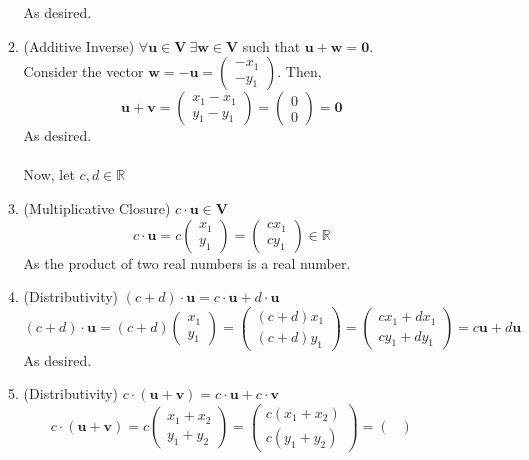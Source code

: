 \documentclass[letterpaper,10pt]{article}
\newcommand{\R}{\mathbb{R}}
\newcommand{\vect}[1]{\boldsymbol{#1}}
\begin{document}
\begin{description}
\begin{enumerate}
\begin{enumerate}
As desired.
\item (Additive Inverse) $\forall\vect{u}\in\vect{V}\ \exists\vect{w}\in\vect{V}$ such that $\vect{u}+\vect{w}=\vect{0}$.\\
Consider the vector $\vect{w}=-\vect{u}=\begin{pmatrix}
-x_1 \\
-y_1
\end{pmatrix}$. Then,
\[\vect{u}+\vect{v}=\begin{pmatrix}
x_1-x_1 \\
y_1-y_1
\end{pmatrix}=\begin{pmatrix}
0 \\
0
\end{pmatrix}=\vect{0}\]
As desired.\\\\
Now, let $c,d\in\R$
\item (Multiplicative Closure) $c\cdot\vect{u}\in\vect{V}$
\[c\cdot\vect{u}=c\begin{pmatrix}
x_1 \\
y_1
\end{pmatrix}=\begin{pmatrix}
cx_1 \\
cy_1
\end{pmatrix}\in\R\]
As the product of two real numbers is a real number.
\item  (Distributivity) $(c+d)\cdot\vect{u}=c\cdot\vect{u}+d\cdot\vect{u}$
\[(c+d)\cdot\vect{u}=(c+d)\begin{pmatrix}
x_1 \\
y_1
\end{pmatrix}=\begin{pmatrix}
(c+d)x_1 \\
(c+d)y_1
\end{pmatrix}=\begin{pmatrix}
cx_1+dx_1 \\
cy_1+dy_1
\end{pmatrix}=c\vect{u}+d\vect{u}\]
As desired.
\item (Distributivity) $c\cdot(\vect{u}+\vect{v})=c\cdot\vect{u}+c\cdot\vect{v}$
\[c\cdot(\vect{u}+\vect{v})=c\begin{pmatrix}
x_1+x_2\\
y_1+y_2
\end{pmatrix}=\begin{pmatrix}
c(x_1+x_2) \\
c(y_1+y_2)
\end{pmatrix}=\begin{pmatrix}

\end{pmatrix}\]
\end{enumerate}
\end{enumerate}
\end{description}
\end{document}
